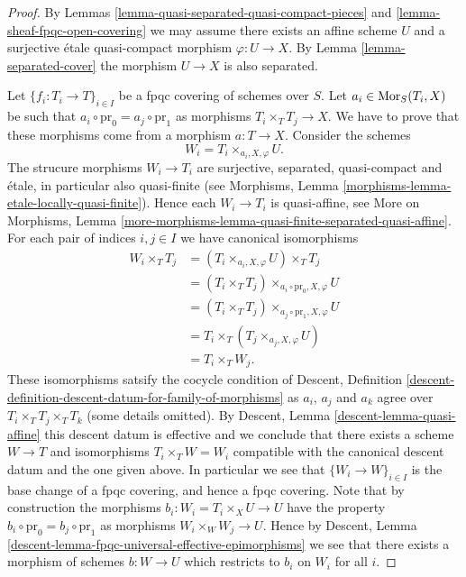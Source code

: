 \begin{proof}
By
Lemmas \ref{lemma-quasi-separated-quasi-compact-pieces}
and \ref{lemma-sheaf-fpqc-open-covering}
we may assume there exists an affine scheme $U$ and a
surjective \'etale quasi-compact morphism $\varphi : U \to X$.
By
Lemma \ref{lemma-separated-cover}
the morphism $U \to X$ is also separated.

\medskip\noindent
Let $\{f_i : T_i \to T\}_{i \in I}$ be a fpqc covering of schemes over $S$.
Let $a_i \in \mathop{\rm Mor}\nolimits_S(T_i, X)$ be such that
$a_i \circ \text{pr}_0 = a_j \circ \text{pr}_1$ as morphisms
$T_i \times_T T_j \to X$. We have to prove that these morphisms
come from a morphism $a : T \to X$. Consider the schemes
$$
W_i = T_i \times_{a_i, X, \varphi} U.
$$
The strucure morphisms $W_i \to T_i$ are surjective, separated, quasi-compact
and \'etale, in particular also quasi-finite (see
Morphisms, Lemma \ref{morphisms-lemma-etale-locally-quasi-finite}).
Hence each $W_i \to T_i$ is quasi-affine, see
More on Morphisms,
Lemma \ref{more-morphisms-lemma-quasi-finite-separated-quasi-affine}.
For each pair of indices $i, j \in I$ we have canonical isomorphisms
\begin{align*}
W_i \times_T T_j & =
(T_i \times_{a_i, X, \varphi} U) \times_T T_j \\
& =
(T_i \times_T T_j) \times_{a_i \circ \text{pr}_0, X, \varphi} U \\
& =
(T_i \times_T T_j) \times_{a_j \circ \text{pr}_1, X, \varphi} U \\
& =
T_i \times_T (T_j \times_{a_j, X, \varphi} U) \\
& =
T_i \times_T W_j.
\end{align*}
These isomorphisms satsify the cocycle condition of
Descent,
Definition \ref{descent-definition-descent-datum-for-family-of-morphisms}
as $a_i$, $a_j$ and $a_k$ agree over $T_i \times_T T_j \times_T T_k$
(some details omitted). By
Descent, Lemma \ref{descent-lemma-quasi-affine}
this descent datum is effective and
we conclude that there exists a scheme $W \to T$ and isomorphisms
$T_i \times_T W = W_i$ compatible with the canonical descent datum
and the one given above. In particular we see that
$\{W_i \to W\}_{i \in I}$ is the base change of a fpqc covering,
and hence a fpqc covering. Note that by construction the
morphisms $b_i : W_i = T_i \times_X U \to U$ have the property
$b_i \circ \text{pr}_0 = b_j \circ \text{pr}_1$ as morphisms
$W_i \times_W W_j \to U$. Hence by
Descent, Lemma \ref{descent-lemma-fpqc-universal-effective-epimorphisms}
we see that there exists a morphism of schemes $b : W \to U$
which restricts to $b_i$ on $W_i$ for all $i$.


\end{proof}
